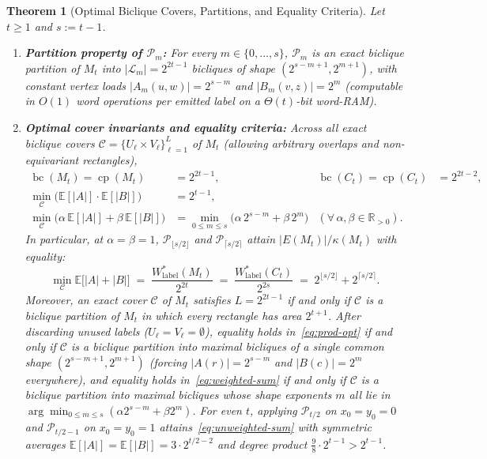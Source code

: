 \documentclass[11pt,reqno]{amsart}
\newtheorem{theorem}{Theorem}[section]
\theoremstyle{definition}
\theoremstyle{remark}
\DeclareMathOperator{\bc}{bc}
\DeclareMathOperator{\cp}{cp}
\newcommand{\RR}{\mathbb{R}}
\newcommand{\EE}{\mathbb{E}}
\numberwithin{equation}{section}
\begin{document}
\begin{theorem}[Optimal Biclique Covers, Partitions, and Equality Criteria]
  \label{thm:optimal-covers}
  Let $t \ge 1$ and $s := t - 1$.
  \begin{enumerate}[leftmargin=2em,label=\textup{(\alph*)}]
    \item \textbf{Partition property of $\mathcal{P}_m$:} For every $m \in \{0, \dots, s\}$, $\mathcal{P}_m$ is an exact biclique partition of $M_t$ into $|\mathcal{L}_m| = 2^{2t-1}$ bicliques of shape $(2^{s-m+1}, 2^{m+1})$, with constant vertex loads $|A_m(u, w)| = 2^{s-m}$ and $|B_m(v, z)| = 2^m$ (computable in $O(1)$ word operations per emitted label on a $\Theta(t)$-bit word-RAM).

    \item \textbf{Optimal cover invariants and equality criteria:} Across all exact biclique covers $\mathcal{C} = \{U_\ell \times V_\ell\}_{\ell=1}^L$ of $M_t$ (allowing arbitrary overlaps and non-equivariant rectangles),
    \begin{align}
      \bc(M_t) = \cp(M_t) &= 2^{2t - 1}, & \bc(C_t) = \cp(C_t) &= 2^{2t - 2}, \label{eq:bc-cp} \\
      \min_{\mathcal{C}} \bigl(\EE[|A|] \cdot \EE[|B|]\bigr) &= 2^{t - 1}, \label{eq:prod-opt} \\
      \min_{\mathcal{C}} \bigl(\alpha\,\EE[|A|] + \beta\,\EE[|B|]\bigr) &= \min_{0 \le m \le s}\bigl(\alpha\,2^{s-m} + \beta\,2^m\bigr) & (\forall\, \alpha, \beta \in \RR_{>0}). \label{eq:weighted-sum}
    \end{align}
    In particular, at $\alpha = \beta = 1$, $\mathcal{P}_{\lfloor s/2 \rfloor}$ and $\mathcal{P}_{\lceil s/2 \rceil}$ attain $|E(M_t)|/\kappa(M_t)$ with equality:
    \begin{equation}
      \label{eq:unweighted-sum}
      \min_{\mathcal{C}} \EE\bigl[|A| + |B|\bigr] \;=\; \frac{W_{\mathrm{label}}^*(M_t)}{2^{2t}} \;=\; \frac{W_{\mathrm{label}}^*(C_t)}{2^{2s}} \;=\; 2^{\lfloor s/2 \rfloor} + 2^{\lceil s/2 \rceil}.
    \end{equation}
    Moreover, an exact cover $\mathcal{C}$ of $M_t$ satisfies $L = 2^{2t-1}$ if and only if $\mathcal{C}$ is a biclique partition of $M_t$ in which every rectangle has area $2^{t+1}$. After discarding unused labels ($U_\ell = V_\ell = \emptyset$), equality holds in~\eqref{eq:prod-opt} if and only if $\mathcal{C}$ is a biclique partition into maximal bicliques of a single common shape $(2^{s-m+1}, 2^{m+1})$ (forcing $|A(r)| = 2^{s-m}$ and $|B(c)| = 2^m$ everywhere), and equality holds in~\eqref{eq:weighted-sum} if and only if $\mathcal{C}$ is a biclique partition into maximal bicliques whose shape exponents $m$ all lie in $\arg\min_{0 \le m \le s}(\alpha 2^{s-m} + \beta 2^m)$. For even $t$, applying $\mathcal{P}_{t/2}$ on $x_0 = y_0 = 0$ and $\mathcal{P}_{t/2 - 1}$ on $x_0 = y_0 = 1$ attains~\eqref{eq:unweighted-sum} with symmetric averages $\EE[|A|] = \EE[|B|] = 3 \cdot 2^{t/2 - 2}$ and degree product $\frac{9}{8}\cdot 2^{t-1} > 2^{t-1}$.
  \end{enumerate}
\end{theorem}
\end{document}
